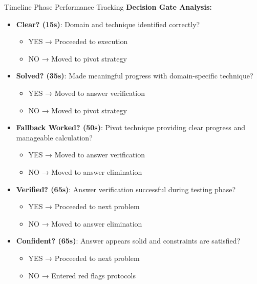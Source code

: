\documentclass{article}
\begin{document}
\begin{analysisbox}{Timeline Phase Performance Tracking}
\textbf{Decision Gate Analysis:}
\begin{itemize}[nosep]
\item[$\square$] \textbf{Clear? (15s)}: Domain and technique identified correctly?
 \begin{itemize}[nosep]
     \item YES → Proceeded to execution
     \item NO → Moved to pivot strategy
 \end{itemize}
\item[$\square$] \textbf{Solved? (35s)}: Made meaningful progress with domain-specific technique?
   \begin{itemize}[nosep]
   \item YES → Moved to answer verification
   \item NO → Moved to pivot strategy
   \end{itemize}
\item[$\square$] \textbf{Fallback Worked? (50s)}: Pivot technique providing clear progress and manageable calculation?
   \begin{itemize}[nosep]
   \item YES → Moved to answer verification
   \item NO → Moved to answer elimination
   \end{itemize}
\item[$\square$] \textbf{Verified? (65s)}: Answer verification successful during testing phase?
   \begin{itemize}[nosep]
   \item YES → Proceeded to next problem
   \item NO → Moved to answer elimination
   \end{itemize}
\item[$\square$] \textbf{Confident? (65s)}: Answer appears solid and constraints are satisfied?
   \begin{itemize}[nosep]
   \item YES → Proceeded to next problem
   \item NO → Entered red flags protocols
   \end{itemize}
\end{itemize}
\end{analysisbox}
\end{document}
